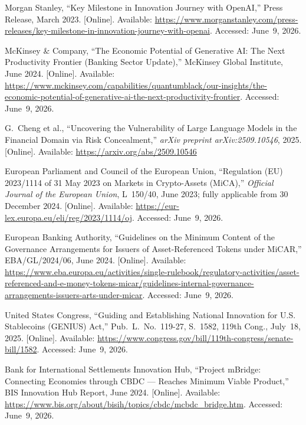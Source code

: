 \documentclass[12pt, a4paper]{report}
\begin{document}
{\begin{enumerate}[label={[\arabic*]}]
\item Morgan Stanley, ``Key Milestone in Innovation Journey with OpenAI,'' Press Release, March 2023. [Online]. Available: \url{https://www.morganstanley.com/press-releases/key-milestone-in-innovation-journey-with-openai}. Accessed: June~9, 2026.

\item McKinsey \& Company, ``The Economic Potential of Generative AI: The Next Productivity Frontier (Banking Sector Update),'' McKinsey Global Institute, June 2024. [Online]. Available: \url{https://www.mckinsey.com/capabilities/quantumblack/our-insights/the-economic-potential-of-generative-ai-the-next-productivity-frontier}. Accessed: June~9, 2026.

\item G.~Cheng et al., ``Uncovering the Vulnerability of Large Language Models in the Financial Domain via Risk Concealment,'' \textit{arXiv preprint arXiv:2509.10546}, 2025. [Online]. Available: \url{https://arxiv.org/abs/2509.10546}

\item European Parliament and Council of the European Union, ``Regulation (EU) 2023/1114 of 31 May 2023 on Markets in Crypto-Assets (MiCA),'' \textit{Official Journal of the European Union}, L~150/40, June 2023; fully applicable from 30 December 2024. [Online]. Available: \url{https://eur-lex.europa.eu/eli/reg/2023/1114/oj}. Accessed: June~9, 2026.

\item European Banking Authority, ``Guidelines on the Minimum Content of the Governance Arrangements for Issuers of Asset-Referenced Tokens under MiCAR,'' EBA/GL/2024/06, June 2024. [Online]. Available: \url{https://www.eba.europa.eu/activities/single-rulebook/regulatory-activities/asset-referenced-and-e-money-tokens-micar/guidelines-internal-governance-arrangements-issuers-arts-under-micar}. Accessed: June~9, 2026.

\item United States Congress, ``Guiding and Establishing National Innovation for U.S. Stablecoins (GENIUS) Act,'' Pub.~L.~No.~119-27, S.~1582, 119th Cong., July~18, 2025. [Online]. Available: \url{https://www.congress.gov/bill/119th-congress/senate-bill/1582}. Accessed: June~9, 2026.

\item Bank for International Settlements Innovation Hub, ``Project mBridge: Connecting Economies through CBDC --- Reaches Minimum Viable Product,'' BIS Innovation Hub Report, June 2024. [Online]. Available: \url{https://www.bis.org/about/bisih/topics/cbdc/mcbdc_bridge.htm}. Accessed: June~9, 2026.


\end{enumerate}}
\end{document}
